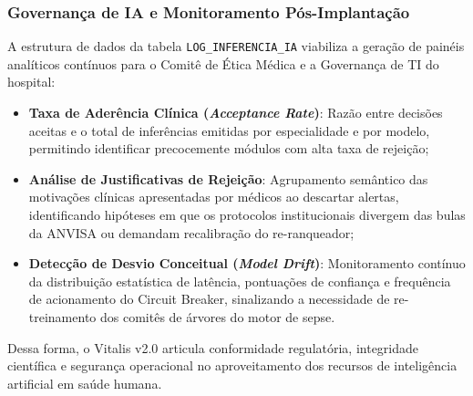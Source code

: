 \subsubsection{Governança de IA e Monitoramento Pós-Implantação}
A estrutura de dados da tabela \texttt{LOG\_INFERENCIA\_IA} viabiliza a geração de painéis analíticos contínuos para o Comitê de Ética Médica e a Governança de TI do hospital:
\begin{itemize}
    \item \textbf{Taxa de Aderência Clínica (\textit{Acceptance Rate})}: Razão entre decisões aceitas e o total de inferências emitidas por especialidade e por modelo, permitindo identificar precocemente módulos com alta taxa de rejeição;
    \item \textbf{Análise de Justificativas de Rejeição}: Agrupamento semântico das motivações clínicas apresentadas por médicos ao descartar alertas, identificando hipóteses em que os protocolos institucionais divergem das bulas da ANVISA ou demandam recalibração do re-ranqueador;
    \item \textbf{Detecção de Desvio Conceitual (\textit{Model Drift})}: Monitoramento contínuo da distribuição estatística de latência, pontuações de confiança e frequência de acionamento do Circuit Breaker, sinalizando a necessidade de re-treinamento dos comitês de árvores do motor de sepse.
\end{itemize}

Dessa forma, o Vitalis v2.0 articula conformidade regulatória, integridade científica e segurança operacional no aproveitamento dos recursos de inteligência artificial em saúde humana.
